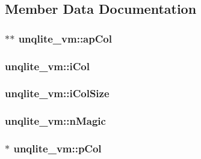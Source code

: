 \subsection{Member Data Documentation}
\hypertarget{structunqlite__vm_a6eb102a58edbd4a59bc626a5455e0636}{
\subsubsection[{ap\-Col}]{$\ast$$\ast$ unqlite\-\_\-vm\-::ap\-Col}}\label{dd/d56/structunqlite__vm_a6eb102a58edbd4a59bc626a5455e0636}
\hypertarget{structunqlite__vm_a9fdd8f1b6e253b75df244dc7b75122d6}{
\subsubsection[{i\-Col}]{ unqlite\-\_\-vm\-::i\-Col}}\label{dd/d56/structunqlite__vm_a9fdd8f1b6e253b75df244dc7b75122d6}
\hypertarget{structunqlite__vm_a5590c2c83f95f8a77c710273a4e44a80}{
\subsubsection[{i\-Col\-Size}]{ unqlite\-\_\-vm\-::i\-Col\-Size}}\label{dd/d56/structunqlite__vm_a5590c2c83f95f8a77c710273a4e44a80}
\hypertarget{structunqlite__vm_a3fb8ffeaeb86ba7ba0b2cc9c1d2469e8}{
\subsubsection[{n\-Magic}]{ unqlite\-\_\-vm\-::n\-Magic}}\label{dd/d56/structunqlite__vm_a3fb8ffeaeb86ba7ba0b2cc9c1d2469e8}
\hypertarget{structunqlite__vm_ac3dfb15fe7846bbb3404eeeaad0e1fb0}{
\subsubsection[{p\-Col}]{$\ast$ unqlite\-\_\-vm\-::p\-Col}}\label{dd/d56/structunqlite__vm_ac3dfb15fe7846bbb3404eeeaad0e1fb0}
